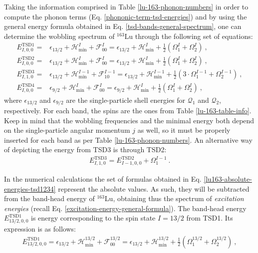 Taking the information comprised in Table \ref{lu-163-phonon-numbers} in order to compute the phonon terms (Eq. \ref{phononic-term-tsd-energies}) and by using the general energy formula obtained in Eq. \ref{tsd-bands-general-spectrum}, one can determine the wobbling spectrum of $^{163}$Lu through the following set of equations:
\begin{align}
    E_{I,0,0}^\text{TSD1}=&\epsilon_{13/2}+\mathcal{H}_\text{min}^I+\mathcal{F}_{00}^I=\epsilon_{13/2}+\mathcal{H}_\text{min}^I+\frac{1}{2}\left(\Omega_1^I+\Omega_2^I\right)\ ,\nonumber\\
    E_{I,0,0}^\text{TSD2}=&\epsilon_{13/2}+\mathcal{H}_\text{min}^I+\mathcal{F}_{00}^I=\epsilon_{13/2}+\mathcal{H}_\text{min}^I+\frac{1}{2}\left(\Omega_1^I+\Omega_2^I\right)\ ,\nonumber\\
    E_{I,1,0}^\text{TSD3}=&\epsilon_{13/2}+\mathcal{H}_\text{min}^{I-1}+\mathcal{F}_{10}^{I-1}=\epsilon_{13/2}+\mathcal{H}_\text{min}^{I-1}+\frac{1}{2}\left(3\cdot\Omega_1^{I-1}+\Omega_2^{I-1}\right)\ ,\nonumber\\
    E_{I,0,0}^\text{TSD4}=&\epsilon_{9/2}+\mathcal{H}_\text{min}^{I}+\mathcal{F}_{00}^{I}=\epsilon_{9/2}+\mathcal{H}_\text{min}^{I}+\frac{1}{2}\left(\Omega_1^{I}+\Omega_2^{I}\right)\ ,
    \label{lu163-absolute-energies-tsd1234}
\end{align}
where $\epsilon_{13/2}$ and $\epsilon_{9/2}$ are the single-particle shell energies for $\mathcal{Q}_1$ and $\mathcal{Q}_2$, respectively. For each band, the spins are the ones from Table \ref{lu-163-table-info}. Keep in mind that the wobbling frequencies and the minimal energy both depend on the single-particle angular momentum $j$ as well, so it must be properly inserted for each band as per Table \ref{lu-163-phonon-numbers}. An alternative way of depicting the energy from TSD3 is through TSD2:
\begin{align}
    E_{I,1,0}^\text{TSD3}=E_{I-1,0,0}^\text{TSD2}+\Omega_1^{I-1}\ .\nonumber
\end{align}

In the numerical calculations the set of formulas obtained in Eq. \ref{lu163-absolute-energies-tsd1234} represent the absolute values. As such, they will be subtracted from the band-head energy of $^{163}$Lu, obtaining thus the spectrum of \emph{excitation energies} (recall Eq. \ref{excitation-energy-general-formula}). The band-head energy $E_{13/2,0,0}^\text{TSD1}$ is energy corresponding to the spin state $I=13/2$ from TSD1. Its expression is as follows:
\begin{align}
    E_{13/2,0,0}^\text{TSD1}=\epsilon_{13/2}+\mathcal{H}_\text{min}^{13/2}+\mathcal{F}_{00}^{13/2}=\epsilon_{13/2}+\mathcal{H}_\text{min}^{13/2}+\frac{1}{2}\left(\Omega_1^{13/2}+\Omega_2^{13/2}\right)\ , \nonumber
\end{align}

